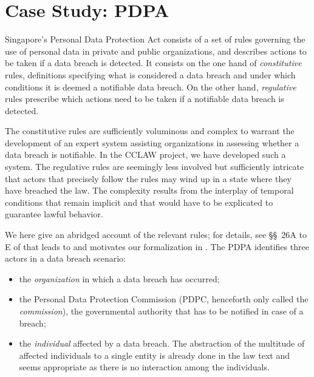 \section{Case Study: PDPA}\label{sec:case_study_pdpa}

Singapore's Personal Data Protection Act \cite{pdpa_link} consists of a set of
rules governing the use of personal data in private and public organizations,
and describes actions to be taken if a data breach is detected. It consists on
the one hand of \emph{constitutive} rules, \ie definitions specifying
what is considered a data breach and under which conditions it is deemed a
notifiable data breach. On the other hand, \emph{regulative} rules prescribe
which actions need to be taken if a notifiable data breach is detected.

The constitutive rules are sufficiently voluminous and complex to warrant the
development of an expert system assisting organizations in assessing whether a
data breach is notifiable. In the CCLAW project, we have developed such a
system. The regulative rules
are seemingly less involved but sufficiently intricate that actors that
precisely follow the rules may wind up in a state where they have breached the
law. The complexity results from the interplay of temporal conditions that
remain implicit and that would have to be explicated to guarantee lawful
behavior.

We here give an abridged account of the relevant rules; for details, see
\S\S~26A to E of \cite{pdpa_link} that leads to and motivates our
formalization in . The PDPA identifies three
actors in a data breach scenario:
\begin{itemize}
\item the \emph{organization} in which a data breach has occurred;
\item the Personal Data Protection Commission (PDPC, henceforth only called
  the \emph{commission}), the governmental authority that has to be notified
  in case of a breach;
\item the \emph{individual} affected by a data breach. The abstraction of the
  multitude of affected individuals to a single entity is already done in the
  law text and seems appropriate as there is no interaction among the
  individuals. 
\end{itemize}


